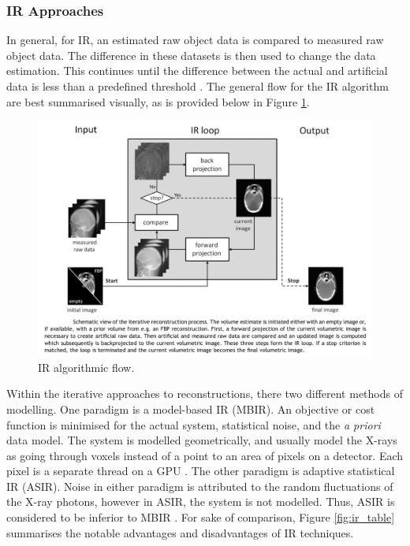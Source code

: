 \documentclass{bmcart}
\begin{document}
\subsubsection*{IR Approaches}
 In general, for IR, an estimated raw object data is compared to measured raw object data. The difference in these datasets is then used to change the data estimation. This continues until the difference between the actual and artificial data is less than a predefined threshold \cite{liu_model-based_2014}. The general flow for the IR algorithm are best summarised visually, as is provided below in Figure \ref{fig:ir_flow}.
\begin{figure}[h!] 
  \includegraphics[scale=.5]{figures/beister_ir.png}
  \caption{ IR algorithmic flow.}
  \label{fig:ir_flow}
\end{figure}
\par Within the iterative approaches to reconstructions, there two different methods of modelling. One paradigm is a model-based IR (MBIR). An objective or cost function is minimised for the actual system, statistical noise, and the \textit{a priori} data model. The system is modelled geometrically, and usually model the X-rays as going through voxels instead of a point to an area of pixels on a detector. Each pixel is a separate thread on a GPU \cite{beister_iterative_2012}. The other paradigm is adaptive statistical IR (ASIR). Noise in either paradigm is attributed to the random fluctuations of the X-ray photons, however in ASIR, the system is not modelled. Thus, ASIR is considered to be inferior to MBIR \cite{liu_model-based_2014}. For sake of comparison, Figure \ref{fig:ir_table} summarises the notable advantages and disadvantages of IR techniques.
\end{document}
